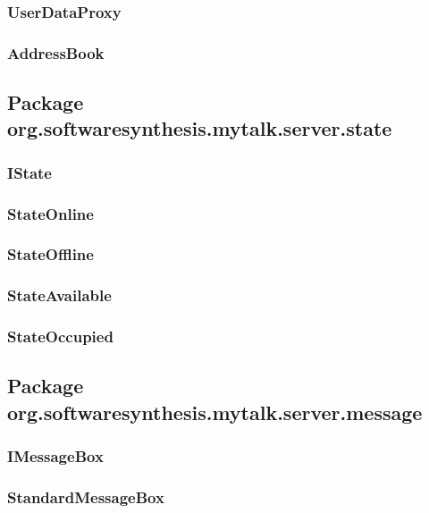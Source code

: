 \subsubsection{UserDataProxy}\label{sec:userdataproxy}

\subsubsection{AddressBook}\label{sec:addressbook}

\subsection{Package org.softwaresynthesis.mytalk.server.state}\label{sec:state}

\subsubsection{IState}\label{sec:istate}

\subsubsection{StateOnline}\label{sec:stateonline}

\subsubsection{StateOffline}\label{sec:stateoffline}

\subsubsection{StateAvailable}\label{sec:stateavailable}

\subsubsection{StateOccupied}\label{sec:stateoccupied}

\subsection{Package org.softwaresynthesis.mytalk.server.message}\label{sec:message}

\subsubsection{IMessageBox}\label{sec:imessagebox}

\subsubsection{StandardMessageBox}\label{sec:standardmessagebox}

